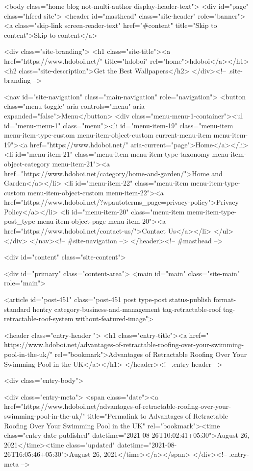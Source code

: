 <body class="home blog not-multi-author display-header-text">
<div id="page" class="hfeed site">
	<header id="masthead" class="site-header" role="banner">
		<a class="skip-link screen-reader-text" href="#content" title="Skip to content">Skip to content</a>

		<div class="site-branding">
						<h1 class="site-title"><a href="https://www.hdoboi.net/" title="hdoboi" rel="home">hdoboi</a></h1>
							<h2 class="site-description">Get the Best Wallpapers</h2>
					</div><!-- .site-branding -->

		<nav id="site-navigation" class="main-navigation" role="navigation">
			<button class="menu-toggle" aria-controls="menu" aria-expanded="false">Menu</button>
			<div class="menu-menu-1-container"><ul id="menu-menu-1" class="menu"><li id="menu-item-19" class="menu-item menu-item-type-custom menu-item-object-custom current-menu-item menu-item-19"><a href="https://www.hdoboi.net/" aria-current="page">Home</a></li>
<li id="menu-item-21" class="menu-item menu-item-type-taxonomy menu-item-object-category menu-item-21"><a href="https://www.hdoboi.net/category/home-and-garden/">Home and Garden</a></li>
<li id="menu-item-22" class="menu-item menu-item-type-custom menu-item-object-custom menu-item-22"><a href="https://www.hdoboi.net/?wpautoterms_page=privacy-policy">Privacy Policy</a></li>
<li id="menu-item-20" class="menu-item menu-item-type-post_type menu-item-object-page menu-item-20"><a href="https://www.hdoboi.net/contact-us/">Contact Us</a></li>
</ul></div>		</nav><!-- #site-navigation -->
	</header><!-- #masthead -->

	<div id="content" class="site-content">

	<div id="primary" class="content-area">
		<main id="main" class="site-main" role="main">

		
			
				
<article id="post-451" class="post-451 post type-post status-publish format-standard hentry category-business-and-management tag-retractable-roof tag-retractable-roof-system without-featured-image">

	
	<header class="entry-header ">
					<h1 class="entry-title"><a href=" https://www.hdoboi.net/advantages-of-retractable-roofing-over-your-swimming-pool-in-the-uk/" rel="bookmark">Advantages of Retractable Roofing Over Your Swimming Pool in the UK</a></h1>			</header><!-- .entry-header -->

	<div class="entry-body">

				<div class="entry-meta">
			<span class="date"><a href="https://www.hdoboi.net/advantages-of-retractable-roofing-over-your-swimming-pool-in-the-uk/" title="Permalink to Advantages of Retractable Roofing Over Your Swimming Pool in the UK" rel="bookmark"><time class="entry-date published" datetime="2021-08-26T10:02:41+05:30">August 26, 2021</time><time class="updated" datetime="2021-08-26T16:05:46+05:30">August 26, 2021</time></a></span>		</div><!-- .entry-meta -->
		

